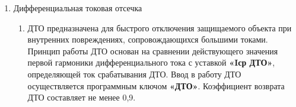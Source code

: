 \begin{enumerate}
\begin{enumerate}
\item Положение горизонтального участка определяется уставкой \textbf{«Iд нач.»}, этот участок является основным рабочим горизонтальным участком. Начало наклонных участков определяется соответствующими токами начала торможения \textbf{«Iт1»} и \textbf{«Iт2»}, а их наклон соответствующими коэффициентами торможения \textbf{«Kт1»} и \textbf{«Kт2»}.

\item Предусмотрена возможность загрубления ДТЗт при выводе УКЕТ. При загрублении вводится грубая характеристика срабатывания ДТЗт, начальный дифференциальный ток срабатывания которой определяется уставкой \textbf{«Iд нач. груб»}.


\end{enumerate}

\item Дифференциальная токовая отсечка
\begin{enumerate}
\item ДТО предназначена для быстрого отключения защищаемого объекта при внутренних повреждениях, сопровождающихся большими токами. Принцип работы ДТО основан на сравнении действующего значения первой гармоники дифференциального тока с уставкой \textbf{«Iср ДТО»}, определяющей ток срабатывания ДТО. Ввод в работу ДТО осуществляется программным ключом \textbf{«ДТО»}. Коэффициент возврата ДТО составляет не менее 0,9.
\end{enumerate}


\end{enumerate}

